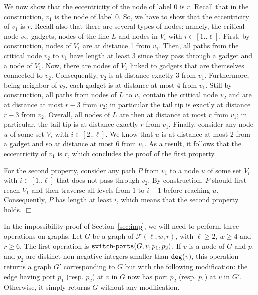 \documentclass[11pt]{article}
\newcommand{\qed}{\hfill $\Box$ \bigbreak}
\newenvironment{proof}{\noindent {\bf Proof.}}{\qed}
\begin{document}
\begin{proof}
 We now show that the eccentricity of the node of label 0 is
 $r$. Recall that in the construction, $v_1$ is the node of label
 0. So, we have to show that the eccentricity of $v_1$ is $r$. Recall
 also that there are several types of nodes: namely, the critical node
 $v_2$, gadgets, nodes of the line $L$ and nodes in $V_i$ with $i \in
 [1..\ell]$.
%
  First, by construction, nodes of $V_1$ are at distance 1 from $v_1$.
  Then, all paths from the critical node $v_2$ to $v_1$ have length at
  least 3 since they pass through a gadget and a node of $V_1$. Now,
  there are nodes of $V_1$ linked to gadgets that are themselves
  connected to $v_2$. Consequently, $v_2$ is at distance exactly 3
  from $v_1$. Furthermore, being neighbor of $v_2$, each gadget is at
  distance at most 4 from $v_1$.
%
  Still by construction, all paths from nodes of $L$ to $v_1$ contain
  the critical node $v_2$ and are at distance at most $r-3$ from
  $v_2$; in particular the tail tip is exactly at distance $r-3$ from
  $v_2$. Overall, all nodes of $L$ are then at distance at most $r$
  from $v_1$; in particular, the tail tip is at distance exactly $r$
  from $v_1$.
%
   Finally, consider any node $u$ of some set $V_i$ with $i \in
   [2..\ell]$. We know that $u$ is at distance at most 2 from a gadget
   and so at distance at most 6 from $v_1$.
%
  As a result, it follows that the eccentricity of $v_1$ is $r$, which concludes the proof of the first property.

  For the second property, consider any path $P$ from $v_1$ to a node $u$ of some
  set $V_i$ with $i \in [1..\ell]$ that does not pass through $v_2$.
  By construction, $P$ should first reach $V_1$ and then
  traverse all levels from $1$ to
  $i-1$ before reaching $u$. Consequently, $P$ has length at least $i$, which means that the second property holds.
\end{proof}


In the impossibility proof of Section~\ref{sec:imp}, we will need to perform three operations on graphs. Let $G$ be a graph of $\mathcal{F}(\ell,w,r)$, with $\ell\geq 2$, $w\geq 4$ and $r\geq 6$. The first operation is ${\tt switch\mbox{-}ports}(G,v,p_1,p_2)$. If $v$ is a node of $G$ and $p_1$ and $p_2$ are distinct non-negative integers smaller than ${\tt deg}(v)$, this operation returns a graph $G'$ corresponding to $G$ but with the following modification: the edge having port $p_1$ (resp. $p_2$) at $v$ in $G$ now has port $p_2$ (resp. $p_1$) at $v$ in $G'$. Otherwise, it simply returns $G$ without any modification.
\end{document}
